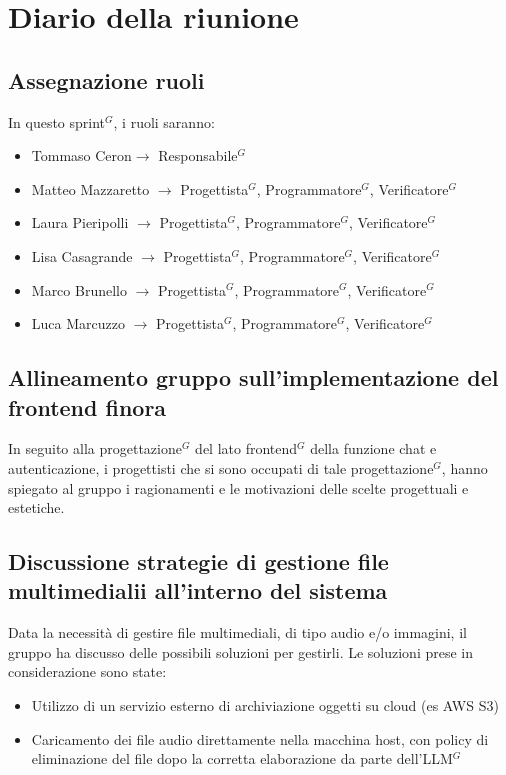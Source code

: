 \section{Diario della riunione}

\subsection{Assegnazione ruoli}
In questo sprint$^G$, i ruoli saranno:
\begin{itemize}
	\item Tommaso Ceron$\rightarrow$ Responsabile$^G$
	\item Matteo Mazzaretto $\rightarrow$ Progettista$^G$, Programmatore$^G$, Verificatore$^G$
	\item Laura Pieripolli $\rightarrow$ Progettista$^G$, Programmatore$^G$, Verificatore$^G$
	\item Lisa Casagrande $\rightarrow$ Progettista$^G$, Programmatore$^G$, Verificatore$^G$
	\item Marco Brunello $\rightarrow$ Progettista$^G$, Programmatore$^G$, Verificatore$^G$
	\item Luca Marcuzzo $\rightarrow$ Progettista$^G$, Programmatore$^G$, Verificatore$^G$
\end{itemize}

\subsection{Allineamento gruppo sull'implementazione del frontend finora}
In seguito alla progettazione$^G$ del lato frontend$^G$ della funzione chat e autenticazione, i progettisti che si sono occupati di tale progettazione$^G$, hanno spiegato al gruppo i ragionamenti e le motivazioni delle scelte progettuali e estetiche.


\subsection{Discussione strategie di gestione file multimedialii all'interno del sistema}
Data la necessità di gestire file multimediali, di tipo audio e/o immagini, il gruppo ha discusso delle possibili soluzioni per gestirli. Le soluzioni prese in considerazione sono state:
\begin{itemize}
	\item Utilizzo di un servizio esterno di archiviazione oggetti su cloud (es AWS S3)
	\item Caricamento dei file audio direttamente nella macchina host, con policy di eliminazione del file dopo la corretta elaborazione da parte dell'LLM$^G$
\end{itemize} 
